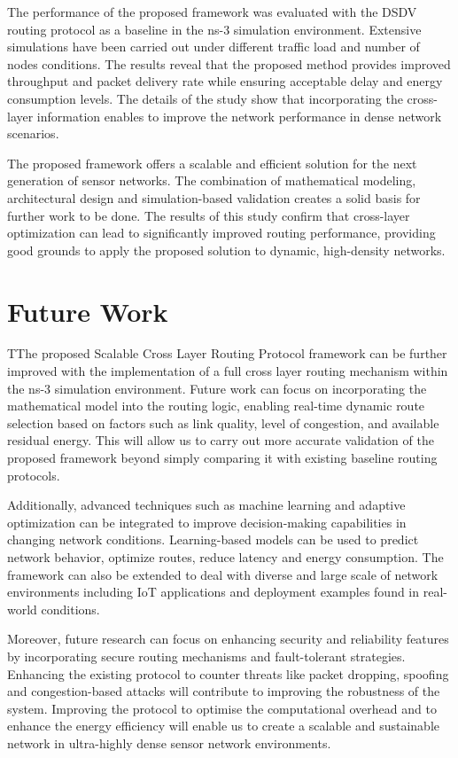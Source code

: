 \documentclass[a4paper,fleqn]{cas-dc}
\numberwithin{equation}{section}
\begin{document}
The performance of the proposed framework was evaluated with the DSDV routing protocol as a baseline in the ns-3 simulation environment. Extensive simulations have been carried out under different traffic load and number of nodes conditions. The results reveal that the proposed method provides improved throughput and packet delivery rate while ensuring acceptable delay and energy consumption levels. The details of the study show that incorporating the cross-layer information enables to improve the network performance in dense network scenarios.

The proposed framework offers a scalable and efficient solution for the next generation of sensor networks. The combination of mathematical modeling, architectural design and simulation-based validation creates a solid basis for further work to be done. The results of this study confirm that cross-layer optimization can lead to significantly improved routing performance, providing good grounds to apply the proposed solution to dynamic, high-density networks.

\section{Future Work}

TThe proposed Scalable Cross Layer Routing Protocol framework can be further improved with the implementation of a full cross layer routing mechanism within the ns-3 simulation environment. Future work can focus on incorporating the mathematical model into the routing logic, enabling real-time dynamic route selection based on factors such as link quality, level of congestion, and available residual energy. This will allow us to carry out more accurate validation of the proposed framework beyond simply comparing it with existing baseline routing protocols.

Additionally, advanced techniques such as machine learning and adaptive optimization can be integrated to improve decision-making capabilities in changing network conditions. Learning-based models can be used to predict network behavior, optimize routes, reduce latency and energy consumption. The framework can also be extended to deal with diverse and large scale of network environments including IoT applications and deployment examples found in real-world conditions.
\newline
\newline
\newline


Moreover, future research can focus on enhancing security and reliability features by incorporating secure routing mechanisms and fault-tolerant strategies. Enhancing the existing protocol to counter threats like packet dropping, spoofing and congestion-based attacks will contribute to improving the robustness of the system. Improving the protocol to optimise the computational overhead and to enhance the energy efficiency will enable us to create a scalable and sustainable network in ultra-highly dense sensor network environments.
\end{document}
